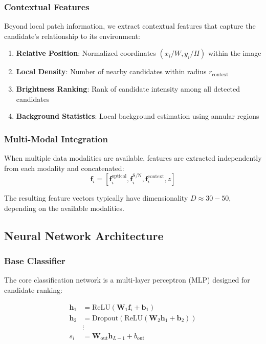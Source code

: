 \documentclass[twocolumn,10pt]{aastex631}
\begin{document}
\subsubsection{Contextual Features}
Beyond local patch information, we extract contextual features that capture the candidate's relationship to its environment:

\begin{enumerate}
\item \textbf{Relative Position}: Normalized coordinates $(x_i/W, y_i/H)$ within the image
\item \textbf{Local Density}: Number of nearby candidates within radius $r_{\text{context}}$
\item \textbf{Brightness Ranking}: Rank of candidate intensity among all detected candidates
\item \textbf{Background Statistics}: Local background estimation using annular regions
\end{enumerate}

\subsubsection{Multi-Modal Integration}
When multiple data modalities are available, features are extracted independently from each modality and concatenated:
\begin{equation}
\mathbf{f}_i = [\mathbf{f}_i^{\text{optical}}, \mathbf{f}_i^{\text{S/N}}, \mathbf{f}_i^{\text{context}}, z]
\end{equation}

The resulting feature vectors typically have dimensionality $D \approx 30-50$, depending on the available modalities.

\subsection{Neural Network Architecture}

\subsubsection{Base Classifier}
The core classification network is a multi-layer perceptron (MLP) designed for candidate ranking:

\begin{align}
\mathbf{h}_1 &= \text{ReLU}(\mathbf{W}_1 \mathbf{f}_i + \mathbf{b}_1) \\
\mathbf{h}_2 &= \text{Dropout}(\text{ReLU}(\mathbf{W}_2 \mathbf{h}_1 + \mathbf{b}_2)) \\
&\vdots \\
s_i &= \mathbf{W}_{\text{out}} \mathbf{h}_{L-1} + b_{\text{out}}
\end{align}
\end{document}

